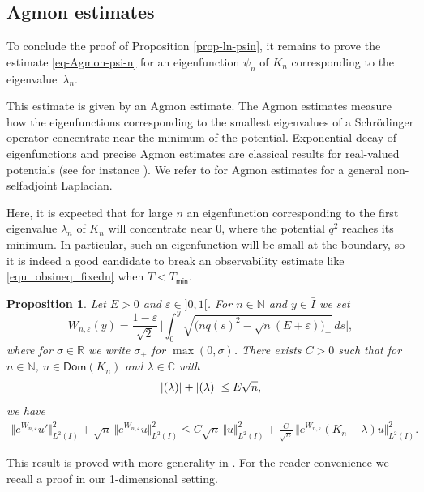 \documentclass[11pt]{article}
\numberwithin{equation}{section}
\theoremstyle{plain}
\newtheorem{proposition}[theorem]{Proposition}
\theoremstyle{definition}
\newcommand{\abs}[1]{\vert #1\vert}
\newcommand{\bbabs}[1]{\biggl\vert #1\biggr\vert}
\newcommand{\nr}[1]{\Vert #1\Vert}
\newcommand{\bnr}[1]{\bigl\Vert #1\bigr\Vert}
\newcommand{\1}{\mathds 1}
\let\Re\relax
\DeclareMathOperator{\Re}{\mathsf{Re}\mkern2mu}
\let\Im\relax
\DeclareMathOperator{\Im}{\mathsf{Im}\mkern2mu}
\newcommand{\Dom}{\mathsf{Dom}}
\newcommand{\R}{\mathbb{R}}
\def\C{\mathbb{C}}
\newcommand{\N}{\mathbb{N}}
\let\e\varepsilon
\let\l\lambda
\let\s\sigma
\newcommand{\Tmin}{T_{\mathsf{min}}}
\begin{document}
\subsection{Agmon estimates} \label{sec-Agmon}

To conclude the proof of Proposition \ref{prop-ln-psin}, it remains to prove the estimate \eqref{eq-Agmon-psi-n} for an eigenfunction $\psi_n$ of $K_n$ corresponding to the eigenvalue~$\l_n$.

This estimate is given by an Agmon estimate. The Agmon estimates measure how the eigenfunctions corresponding to the smallest eigenvalues of a Schrödinger operator concentrate near the minimum of the potential. Exponential decay of eigenfunctions and precise Agmon estimates are classical results for real-valued potentials (see for instance \cite{Agmon85,helffer1}). We refer to \cite{KrejcirikRayRoySie17} for Agmon estimates for a general non-selfadjoint Laplacian.

Here, it is expected that for large $n$ an eigenfunction corresponding to the first eigenvalue $\l_n$ of $K_n$ will concentrate near 0, where the potential $q^2$ reaches its minimum. In particular, such an eigenfunction will be small at the boundary, so it is indeed a good candidate to break an observability estimate like \eqref{equ_obsineq_fixedn} when $T < \Tmin$.

\begin{proposition} \label{prop-Agmon}
Let $E > 0$ and $\e \in{}]0,1[$. For $n \in \N$ and $y \in \bar I$ we set
\begin{equation} \label{def-W}
W_{n,\e}(y) = \frac {1-\e} {\sqrt 2}\, \bbabs{\int_0^y \sqrt{\bigl(nq(s)^2 - \sqrt{n}(E + \e) \bigr)_+} \, ds},
\end{equation}
where for $\s \in \R$ we write $\s_+$ for $\max(0,\s)$. There exists $C > 0$ such that for $n \in \N$, $u \in \Dom(K_n)$ and $\l \in \C$ with
\begin{equation} \label{hyp-lambda}
\abs{\Re(\l)} + \abs{\Im(\l)} \leq E \sqrt n,
\end{equation}
we have
\begin{multline*}
\bnr{e^{W_{n,\e}} u'}_{L^2(I)}^2 + \sqrt n\,\bnr{e^{W_{n,\e}} u}_{L^2(I)}^2
\leq C \sqrt n\,\nr{u}_{L^2(I)}^2 +\frac {C}{\sqrt n}\, \bnr{e^{W_{n,\e}} (K_n-\l)u}_{L^2(I)}^2.
\end{multline*}
\end{proposition}

This result is proved with more generality in \cite{KrejcirikRayRoySie17}. For the reader convenience we recall a proof in our 1-dimensional setting.
\end{document}
